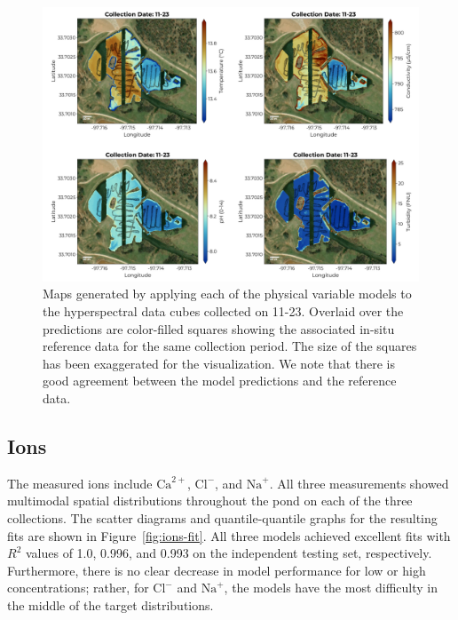 \documentclass[remotesensing,article,submit,pdftex,moreauthors]{Definitions/mdpi}
\begin{document}
\begin{figure}[t!]
\centering
\vspace{-0.3in}
\includegraphics[width=\columnwidth]{paper/figures/results/maps/physical.pdf}
\caption{Maps generated by applying each of the physical variable models to the hyperspectral data cubes collected on 11-23. Overlaid over the predictions are color-filled squares showing the associated in-situ reference data for the same collection period. The size of the squares has been exaggerated for the visualization. We note that there is good agreement between the model predictions and the reference data. \label{fig:map-physical}}
\end{figure}  



\subsection{Ions}

The measured ions include $\mathrm{Ca}^{2+}$, $\mathrm{Cl}^{-}$, and $\mathrm{Na}^{+}$. All three measurements showed multimodal spatial distributions throughout the pond on each of the three collections. The scatter diagrams and quantile-quantile graphs for the resulting fits are shown in Figure~\ref{fig:ions-fit}. All three models achieved excellent fits with $R^2$ values of 1.0, 0.996, and 0.993 on the independent testing set, respectively. Furthermore, there is no clear decrease in model performance for low or high concentrations; rather, for $\textrm{Cl}^{-}$ and $\textrm{Na}^{+}$, the models have the most difficulty in the middle of the target distributions. 
\end{document}
